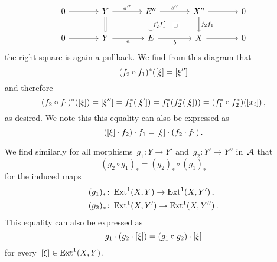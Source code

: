 \begin{remark}
\begin{enumerate}
\[\begin{tikzcd}[column sep = large]
            0
            \arrow{r}
          & Y
            \arrow{r}[above]{a''}
            \arrow[equal]{d}
          & E''
            \arrow{r}[above]{b''}
            \arrow{d}[right]{f'_2 f'_1}
            \arrow[phantom]{dr}[description]{\pb}
          & X''
            \arrow{r}
            \arrow{d}[right]{f_2 f_1}
          & 0
          \\
            0
            \arrow{r}
          & Y
            \arrow{r}[below]{a}
          & E
            \arrow{r}[below]{b}
          & X
            \arrow{r}
          & 0
        \end{tikzcd}
      \]
      the right square is again a pullback.
      We find from this diagram that
      \[
        (f_2 \circ f_1)^*( [\xi] 
        =
        [\xi'']
      \]
      and therefore
      \[
        (f_2 \circ f_1)^*( [\xi] )
        =
        [\xi'']
        =
        f_1^*( [\xi'] )
        =
        f_1^*( f_2^*( [\xi] ) )
        =
        (f_1^* \circ f_2^*)( [x_i] )  \,,
      \]
      as desired.
      We note this this equality can also be expressed as
      \[
        ([\xi] \cdot f_2) \cdot f_1
        =
        [\xi] \cdot (f_2 \cdot f_1) \,.
      \]

      We find similarly for all morphisms~$g_1 \colon Y \to Y'$ and~$g_2 \colon Y' \to Y''$ in~$\mathcal{A}$ that
      \[
        (g_2 \circ g_1)_*
        =
        (g_2)_* \circ (g_1)_*
      \]
      for the induced maps
      \begin{align*}
        (g_1)_*
        &\colon
        \operatorname{Ext}^1(X, Y)
        \to
        \operatorname{Ext}^1(X, Y') \,,
        \\
        (g_2)_*
        &\colon
        \operatorname{Ext}^1(X, Y')
        \to
        \operatorname{Ext}^1(X, Y'') \,.
      \end{align*}
      This equality can also be expressed as
      \[
        g_1 \cdot (g_2 \cdot [\xi])
        =
        (g_1 \circ g_2) \cdot [\xi]
      \]
      for every~$[\xi] \in \operatorname{Ext}^1(X,Y)$.
      

\end{enumerate}
\end{remark}
